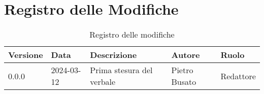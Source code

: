 \section{Registro delle Modifiche}
\begin{table}[ht!]	
		\centering
		\begin{tabular}{p{1.2cm} p{2cm} p{6cm} p{3cm} p{2cm}}
			\toprule
			\textbf{Versione}& \textbf{Data} & \textbf{Descrizione} & \textbf{Autore} & \textbf{Ruolo} \\
			\midrule
			0.0.0 & 2024-03-12 & Prima stesura del verbale  & Pietro Busato & Redattore \\
			\bottomrule
		\end{tabular}
		\caption{Registro delle modifiche}
		\label{table:Registro delle modifiche}
\end{table}